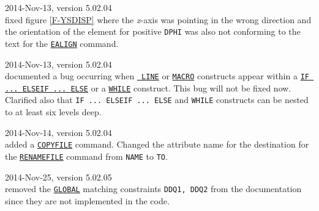 \begin{madlist}
   2014-Nov-13, version 5.02.04\\
  fixed figure \ref{F-YSDISP} where the {\it x}-axis was pointing in
  the wrong direction and the orientation of the element for positive
  {\tt DPHI} was also not conforming to the text for the
  \hyperref[sec:ealign]{\tt EALIGN} command.


   2014-Nov-13, version 5.02.04\\
  documented a bug occurring when \hyperref[sec:line]{\tt 
  LINE} or \hyperref[sec:macro]{\tt MACRO} 
  constructs appear within a \hyperref[sec:if]{\tt IF ... ELSEIF ... ELSE} or a 
  \hyperref[sec:while]{\tt WHILE} construct. This bug will not be fixed now. \\ 
  Clarified also that {\tt IF ... ELSEIF ... ELSE} and {\tt WHILE} constructs 
  can be nested to at least six levels deep.


   2014-Nov-14, version 5.02.04\\
  added a \hyperref[sec:copyfile]{\tt COPYFILE} command. Changed the attribute 
  name for the destination for the \hyperref[sec:renamefile]{\tt RENAMEFILE} 
  command from {\tt NAME} to {\tt TO}.


   2014-Nov-25, version 5.02.05\\
  removed the \hyperref[sec:global]{\tt GLOBAL} matching constraints {\tt DDQ1, 
  DDQ2} from the documentation since they are not implemented in the code. 


\end{madlist}
  


\newpage

